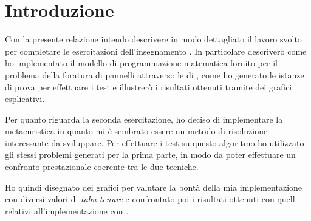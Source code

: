 \section{Introduzione}
Con la presente relazione intendo descrivere in modo dettagliato il lavoro svolto per completare le esercitazioni dell'insegnamento \memoclong. In particolare descriverò come ho implementato il modello di programmazione matematica fornito per il problema della foratura di pannelli attraverso le  di , come ho generato le istanze di prova per effettuare i test e illustrerò i risultati ottenuti tramite dei grafici esplicativi.

Per quanto riguarda la seconda esercitazione, ho deciso di implementare la metaeuristica \tabu in quanto mi è sembrato essere un metodo di risoluzione interessante da sviluppare. Per effettuare i test su questo algoritmo ho utilizzato gli stessi problemi generati per la prima parte, in modo da poter effettuare un confronto prestazionale coerente tra le due tecniche.

Ho quindi disegnato dei grafici per valutare la bontà della mia implementazione con diversi valori di \emph{tabu tenure} e confrontato poi i risultati ottenuti con quelli relativi all'implementazione con .